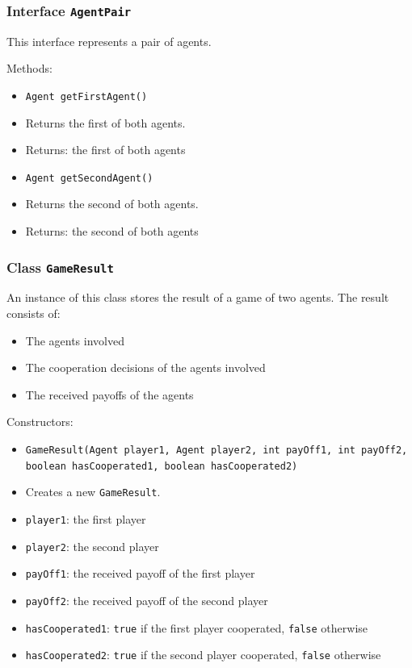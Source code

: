 \documentclass[parskip=full,11pt]{scrartcl}
\begin{document}
\subsubsection{Interface \texttt{AgentPair}}
This interface represents a pair of agents.

Methods:
\begin{itemize}\itemsep -10pt
\item \texttt{Agent getFirstAgent()}
\item[] Returns the first of both agents.
\item[] Returns: the first of both agents

\item \texttt{Agent getSecondAgent()}
\item[] Returns the second of both agents.
\item[] Returns: the second of both agents
\end{itemize}

\subsubsection{Class \texttt{GameResult}}
An instance of this class stores the result of a game of two agents. The result consists of:

\begin{itemize}\itemsep -10pt
	\item The agents involved
	\item The cooperation decisions of the agents involved
	\item The received payoffs of the agents
\end{itemize}

Constructors:
\begin{itemize}\itemsep -10pt
\item \texttt{GameResult(Agent player1, Agent player2, int payOff1, int payOff2, boolean hasCooperated1, boolean hasCooperated2)}
\item[] Creates a new \texttt{GameResult}.
\item[] \texttt{player1}: the first player
\item[] \texttt{player2}: the second player
\item[] \texttt{payOff1}: the received payoff of the first player
\item[] \texttt{payOff2}: the received payoff of the second player
\item[] \texttt{hasCooperated1}: \texttt{true} if the first player cooperated, \texttt{false} otherwise
\item[] \texttt{hasCooperated2}: \texttt{true} if the second player cooperated, \texttt{false} otherwise
\end{itemize}
\end{document}
